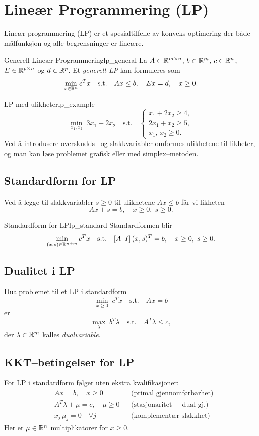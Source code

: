 \section{Lineær Programmering (LP)}
Lineær programmering (LP) er et spesialtilfelle av konveks optimering der både målfunksjon og alle begrensninger er lineære.

\begin{definition}{Generell Lineær Programmering}{lp_general}
	La $A\in\mathbb{R}^{m\times n}$, $b\in\mathbb{R}^m$, $c\in\mathbb{R}^n$, $E\in\mathbb{R}^{p\times n}$ og $d\in\mathbb{R}^p$. Et \emph{generelt LP} kan formuleres som
	\[
		\min_{x\in\mathbb{R}^n} c^T x
		\quad\text{s.t.}\quad
		A x \le b,\quad
		E x = d,\quad
		x \ge0.
	\]
\end{definition}

\begin{example}{LP med ulikheter}{lp_example}
	\[
		\min_{x_1,x_2} \; 3x_1 + 2x_2
		\quad\text{s.t.}\quad
		\begin{cases}
			x_1 + 2x_2 \ge 4,  \\
			2x_1 +  x_2 \ge 5, \\
			x_1,\,x_2 \ge 0.
		\end{cases}
	\]
	Ved å introdusere overskudds-- og slakkvariabler omformes ulikhetene til likheter, og man kan løse problemet grafisk eller med simplex--metoden.
\end{example}
\subsection{Standardform for LP}
Ved å legge til slakkvariabler $s\ge0$ til ulikhetene $A x\le b$ får vi likheten
\[
	A x + s = b,\quad x\ge0,\;s\ge0.
\]
\begin{definition}{Standardform for LP}{lp_standard}
	Standardformen blir
	\[
		\min_{(x,s)\in\mathbb{R}^{n+m}} c^T x
		\quad\text{s.t.}\quad
		[A\;\;I]\,(x,s)^T = b,\quad
		x\ge0,\;s\ge0.
	\]
\end{definition}

\subsection{Dualitet i LP}
Dualproblemet til et LP i standardform
\[
	\min_{x\ge0}\;c^T x
	\quad\text{s.t.}\quad
	A x = b
\]
er
\[
	\max_{\lambda}\;b^T\lambda
	\quad\text{s.t.}\quad
	A^T\lambda \le c,
\]
der $\lambda\in\mathbb{R}^m$ kalles \emph{dualvariable}.

\subsection{KKT--betingelser for LP}
For LP i standardform følger uten ekstra kvalifikasjoner:
\begin{align*}
	 & A x = b,\quad x\ge0                &  & \text{(primal gjennomførbarhet)}  \\
	 & A^T\lambda + \mu = c,\quad \mu\ge0 &  & \text{(stasjonaritet + dual gj.)} \\
	 & x_j\,\mu_j = 0\quad\forall j       &  & \text{(komplementær slakkhet)}
\end{align*}
Her er $\mu\in\mathbb{R}^n$ multiplikatorer for $x\ge0$.

